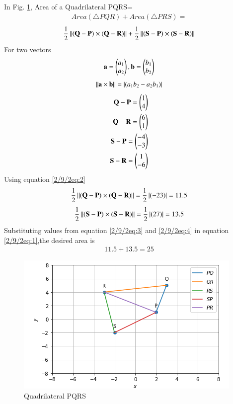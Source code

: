 
In Fig.     \ref{2/9/2fig:Quad PQRS},
 Area of a Quadrilateral PQRS=
\begin{align}
Area (\triangle PQR)+ Area (\triangle PRS)=
\end{align}
\begin{equation}
\frac{1}{2}\left\lVert(\mathbf{Q}-\mathbf{P})\times(\mathbf{Q}-\mathbf{R})\right\rVert+\frac{1}{2}\left\lVert\mathbf{(\mathbf{S}-\mathbf{P})\times(\mathbf{S}-\mathbf{R})}\right\rVert
\label{2/9/2eq:1}
\end{equation}
For two vectors
\begin{align}
\mathbf{a}=\begin{pmatrix}a_1\\a_2\end{pmatrix} , \mathbf{b}=\begin{pmatrix}b_1\\b_2\end{pmatrix}
\end{align}
\begin{equation}
\left\lVert\mathbf{\mathbf{a}\times\mathbf{b}}\right\rVert=\left\vert(a_1b_2-a_2b_1)\right\vert
\label{2/9/2eq:2}
\end{equation}
\begin{align}
\mathbf{Q-P}=\begin{pmatrix}1\\4\end{pmatrix}\\
\mathbf{Q-R}=\begin{pmatrix}6\\1\end{pmatrix}\\
\mathbf{S-P}=\begin{pmatrix}-4\\-3\end{pmatrix}\\
\mathbf{S-R}=\begin{pmatrix}1\\-6\end{pmatrix}
\end{align}
Using equation \eqref{2/9/2eq:2}
\begin{equation}
\frac{1}{2}\left\lVert\mathbf{(\mathbf{Q}-\mathbf{P})\times(\mathbf{Q}-\mathbf{R})}\right\rVert
=\frac{1}{2}\left\vert(-23)\right\vert=11.5
\label{2/9/2eq:3}
\end{equation}
\begin{equation}
\frac{1}{2}\left\lVert\mathbf{(\mathbf{S}-\mathbf{P})\times(\mathbf{S}-\mathbf{R})}\right\rVert
=\frac{1}{2}\left\vert(27)\right\vert=13.5    
\label{2/9/2eq:4}
\end{equation}
Substituting values from equation \eqref{2/9/2eq:3} and \eqref{2/9/2eq:4} in equation \eqref{2/9/2eq:1},the desired area is
\begin{align}
11.5+13.5
=25 
\end{align}
\begin{figure}[!ht]
    \centering
    \includegraphics[width=\columnwidth]{2/solution/2/9/2/QUAD.PNG}
    \caption{Quadrilateral PQRS}
    \label{2/9/2fig:Quad PQRS}
\end{figure}


